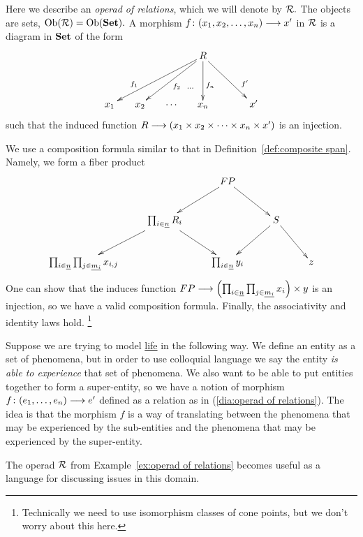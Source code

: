\documentclass[../main/CT4S-EN-RU]{subfiles}
\begin{document}
\begin{exampleENG}\label{ex:operad of relations}
Here we describe an {\em operad of relations}, which we will denote by $\mathcal{R}.$ The objects are sets, $\operatorname{Ob}(\mathcal{R})=\operatorname{Ob}({\mathbf{Set}}).$ A morphism $f\colon (x_1,x_2,\ldots,x_n)\longrightarrow x'$ in $\mathcal{R}$ is a diagram in ${\mathbf{Set}}$ of the form 
\begin{align}\label{dia:operad of relations}
\xymatrix@=15pt{&&&R\ar[llldd]_(.7){f_1}\ar[lldd]^{f_2}\ar@{}[ldd]^(.6)\cdots\ar[dd]^(.6){f_n}\ar[rrdd]^(.7){f'}\\\\x_1&x_2&\cdots&x_n&&x'}
\end{align} 
such that the induced function $R\longrightarrow(x_1\times x_2\times\cdots\times x_n\times x')$ is an injection.

We use a composition formula similar to that in Definition~\ref{def:composite span}. Namely, we form a fiber product
$$\xymatrix{&&FP\ar[rd]\ar[ld]\\&\prod_{i\in\ul{n}}R_i\ar[ld]\ar[rd]&&S\ar[ld]\ar[rd]\\\prod_{i\in\ul{n}}\prod_{j\in\ul{m_i}}x_{i,j}&&\prod_{i\in\ul{n}}y_i&&z}$$
One can show that the induces function $FP\longrightarrow\left(\prod_{i\in\underline{n}}\prod_{j\in\underline{m_i}}x_i\right)\times y$ is an injection, so we have a valid composition formula. Finally, the associativity and identity laws hold.
\footnote{Technically we need to use isomorphism classes of cone points, but we don't worry about this here.}
\end{exampleENG}

\begin{exampleRUS}\label{ex:operad of relations}
\end{exampleRUS}

\begin{applicationENG}\label{app:entity by experience}
Suppose we are trying to model \href{http://en.wikipedia.org/wiki/Life}{\text life} in the following way. We define an entity as a set of phenomena, but in order to use colloquial language we say the entity {\em is able to experience} that set of phenomena. We also want to be able to put entities together to form a super-entity, so we have a notion of morphism $f\colon(e_1,\ldots,e_n)\longrightarrow e'$ defined as a relation as in (\ref{dia:operad of relations}). The idea is that the morphism $f$ is a way of translating between the phenomena that may be experienced by the sub-entities and the phenomena that may be experienced by the super-entity. 

The operad $\mathcal{R}$ from Example~\ref{ex:operad of relations} becomes useful as a language for discussing issues in this domain.
\end{applicationENG}
\end{document}
